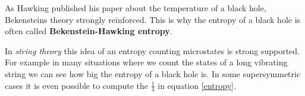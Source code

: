 	As Hawking published his paper about the temperature of a black hole, Bekensteins theory strongly reinforced. This is why the entropy of a black hole is often called \textbf{Bekenstein-Hawking entropy}. 
	
	In \textit{string theory} this idea of an entropy counting microstates is strong supported. For example in many situations where we count the states of a long vibrating string we can see how big the entropy of a black hole is. In some supersymmetric cases it is even possible to compute the $\frac{1}{4}$ in equation \eqref{entropy}.